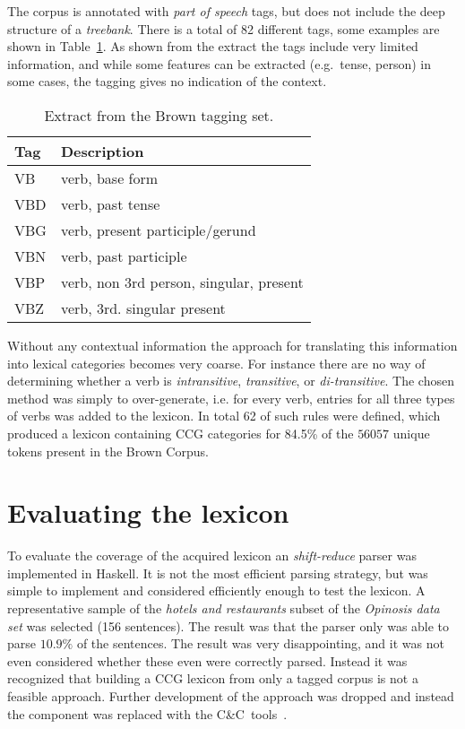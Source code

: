 The corpus is annotated with \emph{part of speech} tags, but does not include the deep structure of a \emph{treebank}. There is a total of 82 different tags, some examples are shown in Table~\ref{tab:brownTags}. As shown from the extract the tags include very limited information, and while some features can be extracted (e.g.\ tense, person) in some cases, the tagging gives no indication of the context.
\begin{table}[ht]
\begin{center}
\begin{tabular}{ll}
  Tag & Description \\ \hline \hline
  VB  & verb, base form \\ \hline
  VBD & verb, past tense \\ \hline
  VBG & verb, present participle/gerund \\ \hline
  VBN & verb, past participle \\ \hline
  VBP & verb, non 3rd person, singular, present \\ \hline
  VBZ & verb, 3rd. singular present 
\end{tabular}
\end{center}
\caption{Extract from the Brown tagging set.}
\label{tab:brownTags}
\end{table}

Without any contextual information the approach for translating this information into lexical categories  becomes very coarse. For instance there are no way of determining whether a verb is \emph{intransitive}, \emph{transitive}, or \emph{di-transitive}. The chosen method was simply to over-generate, i.e. for every verb, entries for all three types of verbs was added to the lexicon. In total 62 of such rules were defined, which produced a lexicon containing CCG categories for 84.5\% of the $\num{56057}$ unique tokens present in the Brown Corpus.

\section*{Evaluating the lexicon}
To evaluate the coverage of the acquired lexicon an \emph{shift-reduce} parser was implemented in Haskell. It is not the most efficient parsing strategy, but was simple to implement and considered efficiently enough to test the lexicon. A representative sample of the \emph{hotels and restaurants} subset of the \emph{Opinosis data set} was selected (156 sentences). The result was that the parser only was able to parse $10.9\%$ of the sentences. The result was very disappointing, and it was not even considered whether these even were correctly parsed. Instead it was recognized that building a CCG lexicon from only a tagged corpus is not a feasible approach. Further development of the approach was dropped and instead the component was replaced with the C\&C~tools~\cite{candc}.



